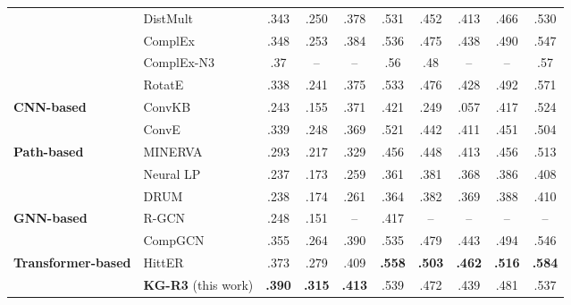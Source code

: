 \begin{table*}[htbp]
\begin{tabular}{llcccc|cccc}
& DistMult \citep{yang2014embedding} & .343	& .250 & .378 & .531 & .452	& .413 & .466 & .530\\
& ComplEx \citep{trouillon2016complex} & .348 & .253 & .384 & .536 & .475 & .438 & .490 & .547\\
& ComplEx-N3 \citep{Lacroix2018CanonicalTD} & .37 & -- & -- & .56 & .48 & -- & -- & .57 \\
& RotatE \citep{sun2018rotate} & .338 & .241 & .375 & .533 & .476 & .428 & .492 & .571\\ \midrule
\textbf{CNN-based} & ConvKB \citep{nguyen2017novel} & .243 & .155 & .371 & .421 & .249 & .057 & .417 & .524 \\
& ConvE \citep{dettmers2018convolutional} & .339 & .248	& .369 & .521 & .442 & .411 & .451 & .504\\
\midrule
\textbf{Path-based} & MINERVA \citep{das2018go} & .293 & .217 & .329 & .456 & .448 & .413 & .456 & .513\\
& Neural LP \citep{yang2017differentiable} &  .237 & .173 & .259 & .361 & .381 & .368 & .386 & .408\\
& DRUM \citep{sadeghian2019drum} & .238 & .174 & .261 & .364 & .382 & .369 & .388 & .410\\
\midrule
\textbf{GNN-based} & R-GCN \citep{schlichtkrull2018modeling} & .248 & .151 & -- & .417 & -- & -- & -- & -- \\
& CompGCN \citep{vashishth2020compositionbased} & .355 & .264 & .390 & .535 & .479 & .443 & .494 & .546 \\
\midrule
\textbf{Transformer-based} & HittER \citep{chen-etal-2021-hitter} & .373 & .279 & .409 & \textbf{.558} & \textbf{.503} & \textbf{.462} & \textbf{.516} & \textbf{.584} \\
 \midrule
& \textbf{KG-R3} (this work) & \textbf{.390} & \textbf{.315}  & \textbf{.413}  & .539 & .472 & .439 & .481 & .537 \\ \bottomrule
\end{tabular}
\end{table*} 